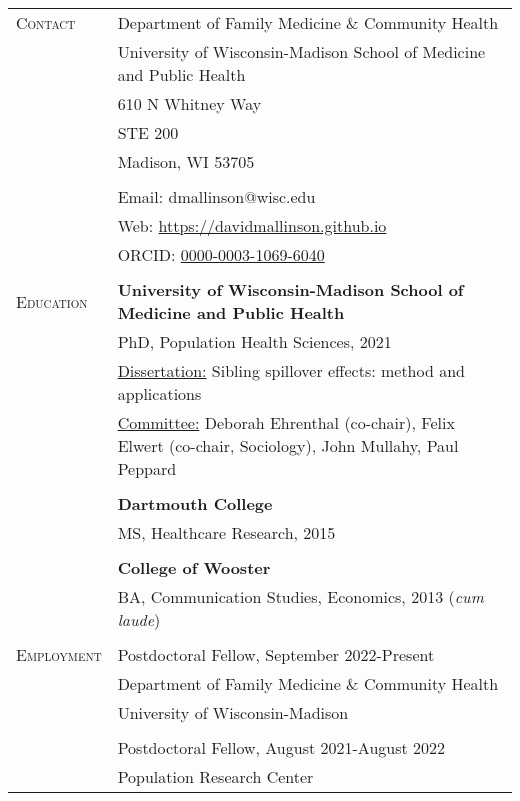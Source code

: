 \documentclass[letterpaper,10pt,oneside]{article}
\begin{document}
\begin{longtable}{@{} p{} p{}}
\textsc{Contact}   & Department of Family Medicine \& Community Health\\
     & University of Wisconsin-Madison School of Medicine and Public Health \\
     & 610 N Whitney Way \\
     & STE 200 \\
     & Madison, WI 53705 \\
     & \\
     & Email: dmallinson@wisc.edu \\
     & Web: \href{https://davidmallinson.github.io}{https://davidmallinson.github.io} \\
     & ORCID: \href{https://orcid.org/0000-0003-1069-6040/}{0000-0003-1069-6040} \\
     & \\
\textsc{Education}    & \textbf{University of Wisconsin-Madison School of Medicine and Public Health} \\
     & PhD, Population Health Sciences, 2021 \\
     & \parbox{6.15in}{\underline{Dissertation:} Sibling spillover effects: method and applications} \\
     & \parbox{6.15in}{\underline{Committee:} Deborah Ehrenthal (co-chair), Felix Elwert (co-chair, Sociology), John Mullahy, Paul Peppard} \\
     & \\
     & \textbf{Dartmouth College} \\
     & MS, Healthcare Research, 2015 \\
     & \\
     & \textbf{College of Wooster} \\
     & BA, Communication Studies, Economics, 2013 (\textit{cum laude}) \\
     & \\
\textsc{Employment} & Postdoctoral Fellow, September 2022-Present \\
     & Department of Family Medicine \& Community Health \\
     & University of Wisconsin-Madison \\
     & \\
     & Postdoctoral Fellow, August 2021-August 2022 \\
     & Population Research Center \\

\end{longtable}
\end{document}
